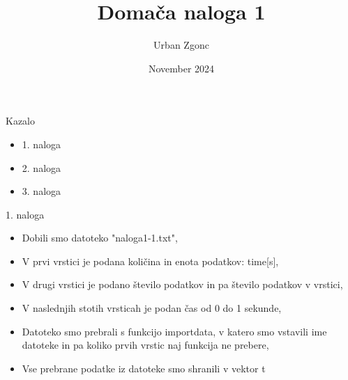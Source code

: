 \documentclass{beamer}
\title{Domača naloga 1}
\author{Urban Zgonc}
\date{November 2024}
\begin{document}
\maketitle

\begin{frame}{Kazalo}

\begin{itemize}
\item 1. naloga
\item 2. naloga
\item 3. naloga
\end{itemize}


\end{frame}


\begin{frame}{1. naloga}

\begin{itemize}
    \item  Dobili smo datoteko "naloga1-1.txt",
    \item  V prvi vrstici je podana količina in enota podatkov: time[s],
    \item  V drugi vrstici je podano število podatkov in pa število podatkov v vrstici,
    \item  V naslednjih stotih vrsticah je podan čas od 0 do 1 sekunde, 
    \item  Datoteko smo prebrali s funkcijo importdata, v katero smo vstavili ime datoteke in pa koliko prvih vrstic naj funkcija ne prebere,
    \item  Vse prebrane podatke iz datoteke smo shranili v vektor t
\end{itemize}  

\end{frame}
\end{document}
